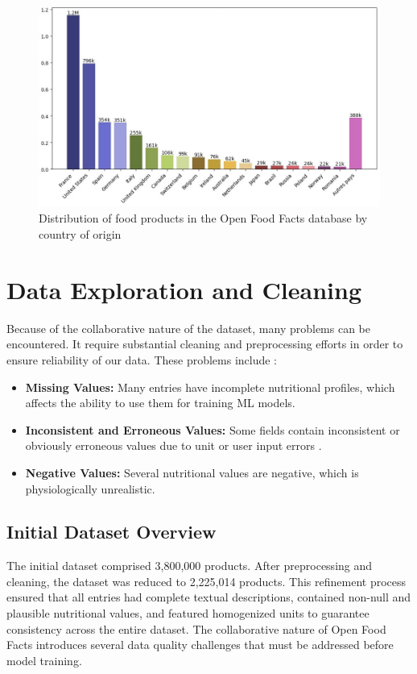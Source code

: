 \begin{figure}[H]
\centering
\includegraphics[scale=0.42]{images/OFF_database.png}
\caption{Distribution of food products in the Open Food Facts database by country of origin} 
\label{fig:country_distribution}
\end{figure}

\section{Data Exploration and Cleaning}
Because of the collaborative nature of the dataset, many problems can be encountered. It require substantial cleaning and preprocessing efforts in order to ensure reliability of our data.
These problems include :

\begin{itemize}[label=\textbf{-}]
\item \textbf{Missing Values:} Many entries have incomplete nutritional profiles, which affects the ability to use them for training ML models.
\item \textbf{Inconsistent and Erroneous Values:} Some fields contain inconsistent or obviously erroneous values due to unit or user input errors .
\item \textbf{Negative Values:} Several nutritional values are negative, which is physiologically unrealistic.
\end{itemize}


\subsection{Initial Dataset Overview}
The initial dataset comprised 3,800,000 products. After preprocessing and cleaning, the dataset was reduced to 2,225,014 products.
This refinement process ensured that all entries had complete textual descriptions, contained non-null and plausible nutritional values, and featured homogenized units to guarantee consistency across the entire dataset.
The collaborative nature of Open Food Facts introduces several data quality challenges that must be addressed before model training.

